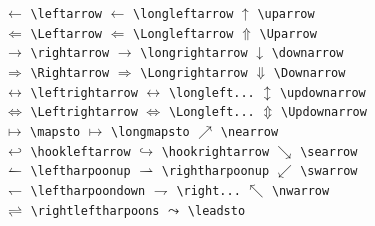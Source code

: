 \begin{table}[!htbp]
\caption[Pfeile]%
        {Pfeile
         (Vertikale Pfeile werden als Klammerungssymbole behandelt, 
         alle anderen als Relationen.
         \footnotemark[1] ben"otigt Paket \texttt{latexsym}.)}
\begin{symbols}
$\leftarrow $\> \verb|\leftarrow| \>$\longleftarrow $\>
\verb|\longleftarrow| \>
  $\uparrow $\> \verb|\uparrow| \\
$\Leftarrow $\> \verb|\Leftarrow| \>$\Longleftarrow $\>
\verb|\Longleftarrow| \>
  $\Uparrow $\> \verb|\Uparrow| \\
$\rightarrow $\> \verb|\rightarrow| \>$\longrightarrow $\>
\verb|\longrightarrow| \>
  $\downarrow $\> \verb|\downarrow| \\
$\Rightarrow $\> \verb|\Rightarrow| \>$\Longrightarrow $\>
\verb|\Longrightarrow| \>
  $\Downarrow $\> \verb|\Downarrow| \\
$\leftrightarrow $\> \verb|\leftrightarrow| \>$\longleftrightarrow $\>
\verb|\longleft...| \>
  $\updownarrow $\> \verb|\updownarrow| \\
$\Leftrightarrow $\> \verb|\Leftrightarrow| \>$\Longleftrightarrow $\>
\verb|\Longleft...| \>
  $\Updownarrow $\> \verb|\Updownarrow| \\
$\mapsto $\> \verb|\mapsto| \>$\longmapsto $\> \verb|\longmapsto| \>
  $\nearrow $\> \verb|\nearrow| \\
$\hookleftarrow $\> \verb|\hookleftarrow| \>$\hookrightarrow $\>
\verb|\hookrightarrow| \>
  $\searrow $\> \verb|\searrow| \\
$\leftharpoonup $\> \verb|\leftharpoonup| \>$\rightharpoonup $\>
\verb|\rightharpoonup| \>
  $\swarrow $\> \verb|\swarrow| \\
$\leftharpoondown $\> \verb|\leftharpoondown| \>$\rightharpoondown $\>
\verb|\right...| \>
  $\nwarrow $\> \verb|\nwarrow| \\
$\rightleftharpoons $\> \verb|\rightleftharpoons| \>\>\>
  $\leadsto $\> \verb|\leadsto|\footnotemark[1] \\
\end{symbols}
\end{table}


